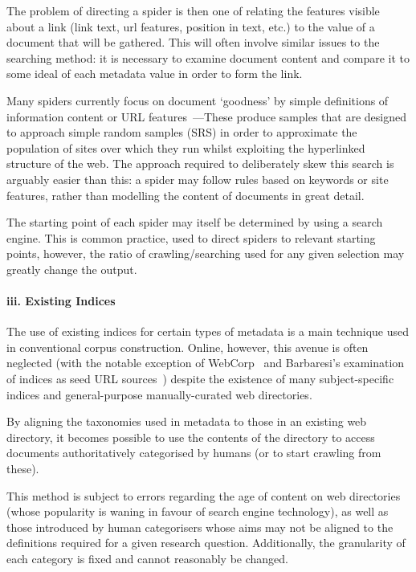 The problem of directing a spider is then one of relating the features visible about a link (link text, url features, position in text, etc.) to the value of a document that will be gathered.  This will often involve similar issues to the searching method: it is necessary to examine document content and compare it to some ideal of each metadata value in order to form the link.

Many spiders currently focus on document `goodness' by simple definitions of information content or URL features~\cite{schafer2014focused,ferraresi2008introducing}---These produce samples that are designed to approach simple random samples (SRS) in order to approximate the population of sites over which they run whilst exploiting the hyperlinked structure of the web.  The approach required to deliberately skew this search is arguably easier than this: a spider may follow rules based on keywords or site features, rather than modelling the content of documents in great detail.

The starting point of each spider may itself be determined by using a search engine.  This is common practice, used to direct spiders to relevant starting points, however, the ratio of crawling/searching used for any given selection may greatly change the output.



\paragraph{iii. Existing Indices}
The use of existing indices for certain types of metadata is a main technique used in conventional corpus construction.  Online, however, this avenue is often neglected (with the notable exception of WebCorp~\cite{renouf2003webcorp} and Barbaresi's examination of indices as seed URL sources~\cite{barbaresi2014finding}) despite the existence of many subject-specific indices and general-purpose manually-curated web directories.

By aligning the taxonomies used in metadata to those in an existing web directory, it becomes possible to use the contents of the directory to access documents authoritatively categorised by humans (or to start crawling from these).

This method is subject to errors regarding the age of content on web directories (whose popularity is waning in favour of search engine technology), as well as those introduced by human categorisers whose aims may not be aligned to the definitions required for a given research question.  Additionally, the granularity of each category is fixed and cannot reasonably be changed.

